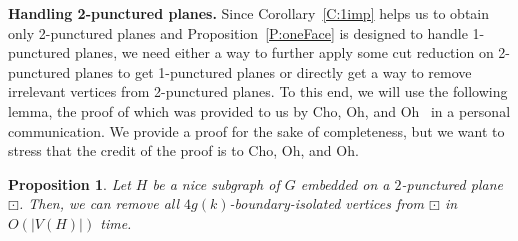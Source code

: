 \documentclass{article}
\newtheorem{proposition}[theorem]{Proposition}
\numberwithin{claimcounter}{lemma}
\begin{document}
\medskip
\noindent\textbf{Handling 2-punctured planes.} Since Corollary~\ref{C:1imp} helps us to obtain only 2-punctured planes and Proposition~\ref{P:oneFace} is designed to handle 1-punctured planes, we need  either a way to further apply some cut reduction on 2-punctured planes to get 1-punctured planes or directly get a way to remove irrelevant vertices from 2-punctured planes. To this end, we will use the following lemma, the proof of which was provided to us by Cho, Oh, and Oh~\cite{cho2023parameterized} in a personal communication. We provide a proof for the sake of completeness, but we want to stress that the credit of the proof is to Cho, Oh, and Oh.
\begin{proposition}\label{L:2Cycle}
    Let $H$ be a nice subgraph of $G$ embedded on a $2$-punctured plane $\boxdot$. Then, we can remove all $4g(k)$-boundary-isolated vertices from $\boxdot$ in $O(|V(H)|)$ time.  
\end{proposition}
\end{document}
